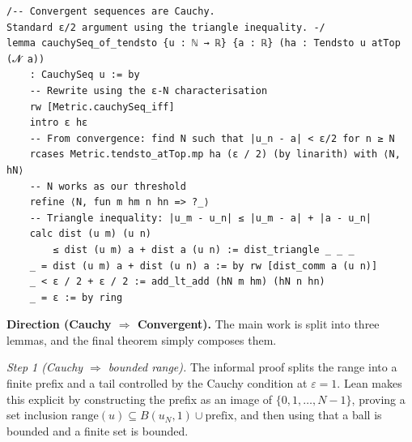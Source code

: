 \documentclass[11pt]{article}
\begin{document}
\begin{verbatim}
/-- Convergent sequences are Cauchy.
Standard ε/2 argument using the triangle inequality. -/
lemma cauchySeq_of_tendsto {u : ℕ → ℝ} {a : ℝ} (ha : Tendsto u atTop (𝓝 a)) 
    : CauchySeq u := by
    -- Rewrite using the ε-N characterisation
    rw [Metric.cauchySeq_iff]
    intro ε hε
    -- From convergence: find N such that |u_n - a| < ε/2 for n ≥ N
    rcases Metric.tendsto_atTop.mp ha (ε / 2) (by linarith) with ⟨N, hN⟩
    -- N works as our threshold
    refine ⟨N, fun m hm n hn => ?_⟩
    -- Triangle inequality: |u_m - u_n| ≤ |u_m - a| + |a - u_n|
    calc dist (u m) (u n)
        ≤ dist (u m) a + dist a (u n) := dist_triangle _ _ _
    _ = dist (u m) a + dist (u n) a := by rw [dist_comm a (u n)]
    _ < ε / 2 + ε / 2 := add_lt_add (hN m hm) (hN n hn)
    _ = ε := by ring
\end{verbatim}

\medskip
\noindent
\textbf{Direction (Cauchy \(\Rightarrow\) Convergent).}
The main work is split into three lemmas, and the final theorem simply composes them.

\smallskip
\noindent
\emph{Step 1 (Cauchy \(\Rightarrow\) bounded range).}
The informal proof splits the range into a finite prefix and a tail controlled by the Cauchy condition at \(\varepsilon=1\).
Lean makes this explicit by constructing the prefix as an image of \(\{0,1,\dots,N-1\}\), proving a set inclusion
\(\mathrm{range}(u)\subseteq B(u_N,1)\cup \mathrm{prefix}\), and then using that a ball is bounded and a finite set is bounded.
\end{document}
